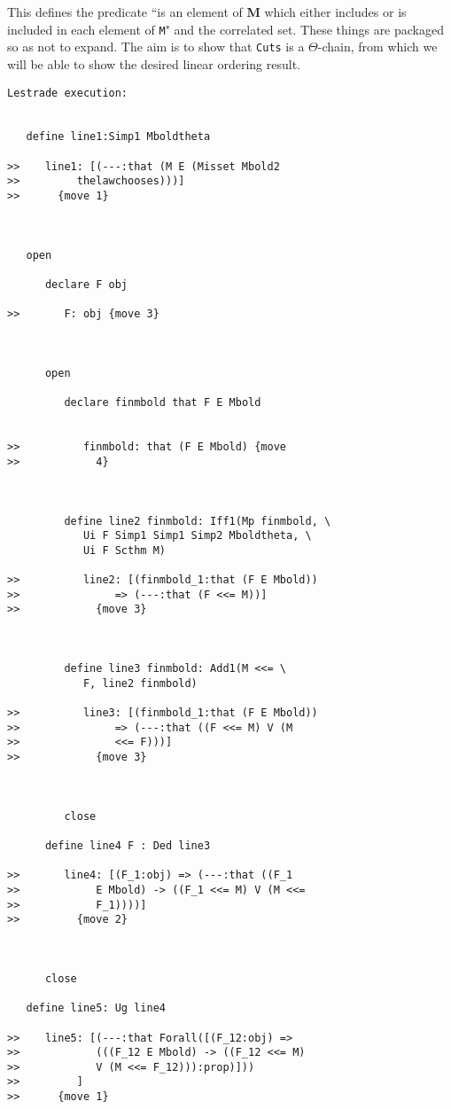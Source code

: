 \documentclass[12pt]{article}
\begin{document}
This defines the predicate ``is an element of {\bf M} which either includes or is included in each element of {\tt M}" and the correlated set.  These things are packaged so as not to expand.
The aim is to show that {\tt Cuts} is a $\Theta$-chain, from which we will be able to show the desired linear ordering result.

\begin{verbatim}Lestrade execution:


   define line1:Simp1 Mboldtheta

>>    line1: [(---:that (M E (Misset Mbold2
>>         thelawchooses)))]
>>      {move 1}



   open

      declare F obj

>>       F: obj {move 3}



      open

         declare finmbold that F E Mbold


>>          finmbold: that (F E Mbold) {move
>>            4}



         define line2 finmbold: Iff1(Mp finmbold, \
            Ui F Simp1 Simp1 Simp2 Mboldtheta, \
            Ui F Scthm M)

>>          line2: [(finmbold_1:that (F E Mbold))
>>               => (---:that (F <<= M))]
>>            {move 3}



         define line3 finmbold: Add1(M <<= \
            F, line2 finmbold)

>>          line3: [(finmbold_1:that (F E Mbold))
>>               => (---:that ((F <<= M) V (M
>>               <<= F)))]
>>            {move 3}



         close

      define line4 F : Ded line3

>>       line4: [(F_1:obj) => (---:that ((F_1
>>            E Mbold) -> ((F_1 <<= M) V (M <<=
>>            F_1))))]
>>         {move 2}



      close

   define line5: Ug line4

>>    line5: [(---:that Forall([(F_12:obj) =>
>>            (((F_12 E Mbold) -> ((F_12 <<= M)
>>            V (M <<= F_12))):prop)]))
>>         ]
>>      {move 1}




\end{verbatim}
\end{document}
